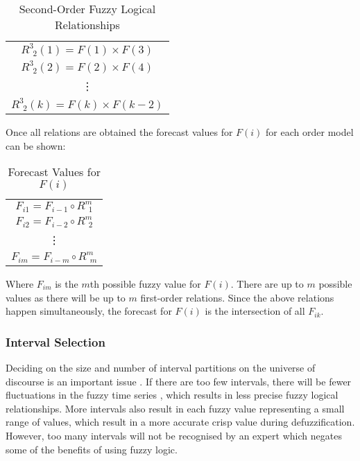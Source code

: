 \documentclass{article}
\theoremstyle{definition}
\begin{document}
\begin{table}[H]
	\center
	\begin{tabular}{ c }
  	$R^{3}_{\ \ 2}(1) = F(1) \times F(3)$ \\
  	$R^{3}_{\ \ 2}(2) = F(2) \times F(4)$ \\
  	\vdots \\
  	$R^{3}_{\ \ 2}(k) = F(k) \times F(k-2)$ \\
	\end{tabular}
	\caption{Second-Order Fuzzy Logical Relationships}
\end{table}

Once all relations are obtained the forecast values for $F(i)$ for each order model can be shown:

\begin{table}[H]
	\center
	\begin{tabular}{ c }
  	$F_{i1} = F_{i-1} \circ R^{m}_{\ \ 1}$ \\
  	$F_{i2} = F_{i-2} \circ R^{m}_{\ \ 2}$ \\
  	\vdots \\
  	$F_{im} = F_{i-m} \circ R^{m}_{\ \ m}$ \\
	\end{tabular}
	\caption{Forecast Values for $F(i)$}
\end{table}

Where $F_{im}$ is the $m$th possible fuzzy value for $F(i)$. There are up to $m$ possible values as there will be up to $m$ first-order relations. Since the above relations happen simultaneously, the forecast for $F(i)$ is the intersection of all $F_{ik}$.

\subsubsection{Interval Selection}

Deciding on the size and number of interval partitions on the universe of discourse is an important issue \citep{Huarng2001effective,  huarng2006ratio}. If there are too few intervals, there will be fewer fluctuations in the fuzzy time series \citep{Huarng2001effective}, which results in less precise fuzzy logical relationships. More intervals also result in each fuzzy value representing a small range of values, which result in a more accurate crisp value during defuzzification. However, too many intervals will not be recognised by an expert which negates some of the benefits of using fuzzy logic.
\end{document}
